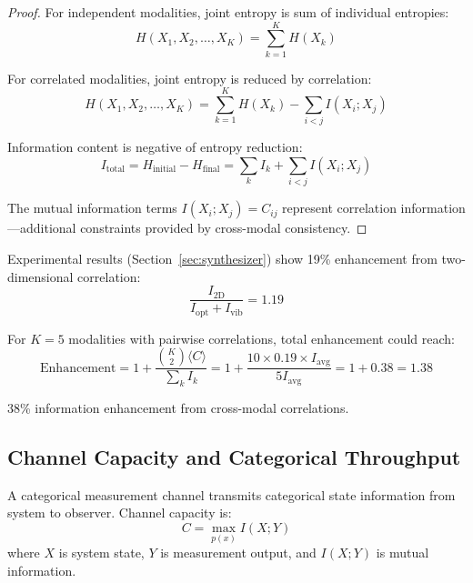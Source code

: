 \begin{proof}
For independent modalities, joint entropy is sum of individual entropies:
\begin{equation}
H(X_1, X_2, \ldots, X_K) = \sum_{k=1}^{K} H(X_k)
\end{equation}

For correlated modalities, joint entropy is reduced by correlation:
\begin{equation}
H(X_1, X_2, \ldots, X_K) = \sum_{k=1}^{K} H(X_k) - \sum_{i<j} I(X_i; X_j)
\end{equation}

Information content is negative of entropy reduction:
\begin{equation}
I_{\text{total}} = H_{\text{initial}} - H_{\text{final}} = \sum_{k} I_k + \sum_{i<j} I(X_i; X_j)
\end{equation}

The mutual information terms $I(X_i; X_j) = C_{ij}$ represent correlation information—additional constraints provided by cross-modal consistency.
\end{proof}

Experimental results (Section~\ref{sec:synthesizer}) show 19\% enhancement from two-dimensional correlation:
\begin{equation}
\frac{I_{2\text{D}}}{I_{\text{opt}} + I_{\text{vib}}} = 1.19
\end{equation}

For $K=5$ modalities with pairwise correlations, total enhancement could reach:
\begin{equation}
\text{Enhancement} = 1 + \frac{\binom{K}{2}\langle C \rangle}{\sum_k I_k} = 1 + \frac{10 \times 0.19 \times I_{\text{avg}}}{5 I_{\text{avg}}} = 1 + 0.38 = 1.38
\end{equation}

38\% information enhancement from cross-modal correlations.

\subsection{Channel Capacity and Categorical Throughput}

\begin{definition}
\label{def:categorical_channel}
A categorical measurement channel transmits categorical state information from system to observer. Channel capacity is:
\begin{equation}
C = \max_{p(x)} I(X; Y)
\end{equation}
where $X$ is system state, $Y$ is measurement output, and $I(X;Y)$ is mutual information.
\end{definition}

